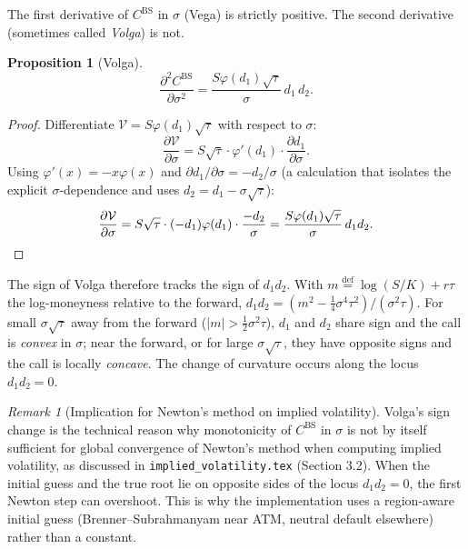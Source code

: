 \documentclass[11pt,a4paper]{article}
\theoremstyle{plain}
\newtheorem{proposition}[theorem]{Proposition}
\theoremstyle{definition}
\theoremstyle{remark}
\newtheorem{remark}[theorem]{Remark}
\newcommand{\eqdef}{\overset{\mathrm{def}}{=}}
\newcommand{\BS}{\mathrm{BS}}
\newcommand{\Vega}{\mathcal{V}}
\begin{document}
The first derivative of \(C^{\BS}\) in \(\sigma\) (Vega) is strictly
positive. The second derivative (sometimes called \emph{Volga}) is
not.

\begin{proposition}[Volga]
\label{prop:volga}
\begin{equation}
    \frac{\partial^2 C^{\BS}}{\partial \sigma^2}
    = \frac{S \varphi(d_1) \sqrt{\tau}}{\sigma}\, d_1\, d_2.
    \label{eq:volga}
\end{equation}
\end{proposition}

\begin{proof}
Differentiate \(\Vega = S\varphi(d_1)\sqrt{\tau}\) with respect to
\(\sigma\):
\[
    \frac{\partial \Vega}{\partial \sigma}
    = S \sqrt{\tau} \cdot \varphi'(d_1) \cdot \frac{\partial d_1}{\partial \sigma}.
\]
Using \(\varphi'(x) = -x \varphi(x)\) and
\(\partial d_1 / \partial \sigma = -d_2 / \sigma\) (a calculation that
isolates the explicit \(\sigma\)-dependence and uses
\(d_2 = d_1 - \sigma\sqrt{\tau}\)):
\[
    \frac{\partial \Vega}{\partial \sigma}
    = S \sqrt{\tau} \cdot (-d_1)\varphi(d_1) \cdot \frac{-d_2}{\sigma}
    = \frac{S\varphi(d_1)\sqrt{\tau}}{\sigma}\, d_1 d_2. \qedhere
\]
\end{proof}

The sign of Volga therefore tracks the sign of \(d_1 d_2\). With
\(m \eqdef \log(S/K) + r\tau\) the log-moneyness relative to the
forward, \(d_1 d_2 = (m^2 - \tfrac{1}{4}\sigma^4\tau^2)/(\sigma^2\tau)\).
For small \(\sigma\sqrt{\tau}\) away from the forward
(\(|m| > \tfrac{1}{2}\sigma^2\tau\)), \(d_1\) and \(d_2\) share sign
and the call is \emph{convex} in \(\sigma\); near the forward, or for
large \(\sigma\sqrt{\tau}\), they have opposite signs and the call is
locally \emph{concave}. The change of curvature occurs along the locus
\(d_1 d_2 = 0\).

\begin{remark}[Implication for Newton's method on implied volatility]
Volga's sign change is the technical reason why monotonicity of
\(C^{\BS}\) in \(\sigma\) is not by itself sufficient for global
convergence of Newton's method when computing implied volatility, as
discussed in \texttt{implied\_volatility.tex} (Section 3.2). When the
initial guess and the true root lie on opposite sides of the locus
\(d_1 d_2 = 0\), the first Newton step can overshoot.
This is why the implementation uses a region-aware initial guess
(Brenner--Subrahmanyam near ATM, neutral default elsewhere) rather
than a constant.
\end{remark}
\end{document}
